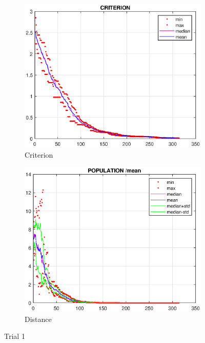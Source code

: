 \documentclass{CSArticle}[english]
\begin{document}
\begin{figure}[h!]
\centering
\begin{subfigure}[b]{0.45\textwidth}
         \centering
         \includegraphics[scale=0.45]{figure/Q5_c1.eps}
         \caption{Criterion}
         \label{fig:Q5_c1}
     \end{subfigure}
     \hfill
     \begin{subfigure}[b]{0.45\textwidth}
         \centering
         \includegraphics[scale=0.45]{figure/Q5_p1.eps}
         \caption{Distance}
         \label{fig:Q5_p1}
     \end{subfigure}
     \caption{Trial 1}
     \label{fig:trial1}
\end{figure}
\end{document}
